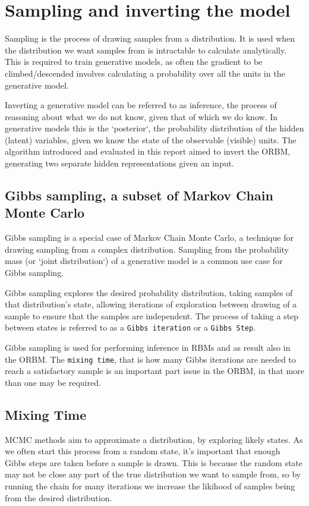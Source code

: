 \section{Sampling and inverting the model}

Sampling is the process of drawing samples from a distribution. It is used when the distribution we want samples from is intractable to calculate analytically. This is required to train generative models, as often the gradient to be climbed/descended involves calculating a probability over all the units in the generative model.

Inverting a generative model can be referred to as inference, the process of reasoning about what we do not know, given that of which we do know. In generative models this is the `posterior`, the probability distribution of the hidden (latent) variables, given we know the state of the observable (visible) units. The algorithm introduced and evaluated in this report aimed to invert the ORBM, generating two separate hidden representations given an input.

\subsection{Gibbs sampling, a subset of Markov Chain Monte Carlo}

Gibbs sampling is a special case of Markov Chain Monte Carlo, a technique for drawing sampling from a complex distribution. Sampling from the probability mass (or `joint distribution`) of a generative model is a common use case for Gibbs sampling.

Gibbs sampling explores the desired probability distribution, taking samples of that distribution's state, allowing iterations of exploration between drawing of a sample to ensure that the samples are independent. The process of taking a step between states is referred to as a \texttt{Gibbs iteration} or a \texttt{Gibbs Step}.

Gibbs sampling is used for performing inference in RBMs and as result also in the ORBM. The \texttt{mixing time}, that is how many Gibbs iterations are needed to reach a satisfactory sample is an important part issue in the ORBM, in that more than one may be required.

\subsection{Mixing Time}

MCMC methods aim to approximate a distribution, by exploring likely states. As we often start this process from a random state, it's important that enough Gibbs steps are taken before a sample is drawn. This is because the random state may not be close any part of the true distribution we want to sample from, so by running the chain for many iterations we increase the likihood of samples being from the desired distribution.


